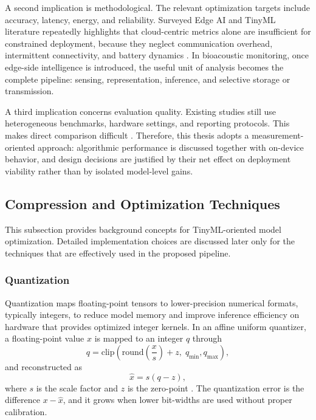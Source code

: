 \documentclass[a4paper,singleside,12pt]{report} %
\begin{document}
	A second implication is methodological. The relevant optimization targets include accuracy, latency, energy, and reliability. Surveyed Edge AI and TinyML literature repeatedly highlights that cloud-centric metrics alone are insufficient for constrained deployment, because they neglect communication overhead, intermittent connectivity, and battery dynamics \cite{abadade2023tinymlsurvey,singh2023edgeaisurvey}. In bioacoustic monitoring, once edge-side intelligence is introduced, the useful unit of analysis becomes the complete pipeline: sensing, representation, inference, and selective storage or transmission.

	\begin{sloppypar}
	A third implication concerns evaluation quality. Existing studies still use heterogeneous benchmarks, hardware settings, and reporting protocols. This makes direct comparison difficult \cite{abadade2023tinymlsurvey}. Therefore, this thesis adopts a measurement-oriented approach: algorithmic performance is discussed together with on-device behavior, and design decisions are justified by their net effect on deployment viability rather than by isolated model-level gains.
	\end{sloppypar}
	\subsection{Compression and Optimization Techniques}
	This subsection provides background concepts for TinyML-oriented model optimization. Detailed implementation choices are discussed later only for the techniques that are effectively used in the proposed pipeline.

	\subsubsection{Quantization}
	Quantization maps floating-point tensors to lower-precision numerical formats, typically integers, to reduce model memory and improve inference efficiency on hardware that provides optimized integer kernels. In an affine uniform quantizer, a floating-point value \(x\) is mapped to an integer \(q\) through
	\begin{equation}
		q = \mathrm{clip}\!\left(\mathrm{round}\!\left(\frac{x}{s}\right)+z,\;q_{\min},q_{\max}\right),
	\end{equation}
	and reconstructed as
	\begin{equation}
		\hat{x}=s(q-z),
	\end{equation}
	where \(s\) is the scale factor and \(z\) is the zero-point \cite{wuint8quant2020}. The quantization error is the difference \(x-\hat{x}\), and it grows when lower bit-widths are used without proper calibration.
\end{document}
